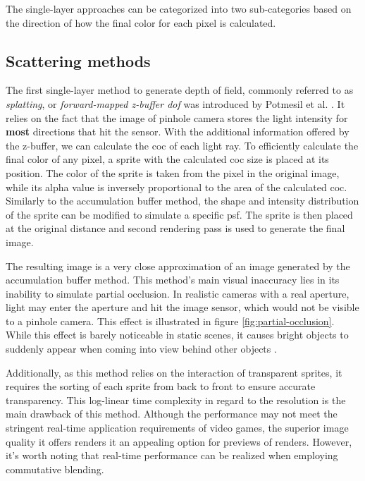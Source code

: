 The single-layer approaches can be categorized into two sub-categories based on the direction of how the final color for each pixel is calculated.

\subsection{Scattering methods}
The first single-layer method to generate depth of field, commonly referred to as \textit{splatting}, or \textit{forward-mapped z-buffer \gls{dof}} was introduced by Potmesil et al. \cite{Potmesil.1981}.
It relies on the fact that the image of pinhole camera stores the light intensity for \textbf{most} directions that hit the sensor.
With the additional information offered by the z-buffer, we can calculate the \gls{coc} of each light ray.
To efficiently calculate the final color of any pixel, a sprite with the calculated \gls{coc} size is placed at its position.
The color of the sprite is taken from the pixel in the original image, while its alpha value is inversely proportional to the area of the calculated \gls{coc}.
Similarly to the accumulation buffer method, the shape and intensity distribution of the sprite can be modified to simulate a specific \gls{psf}.
The sprite is then placed at the original distance and second rendering pass is used to generate the final image.

The resulting image is a very close approximation of an image generated by the accumulation buffer method.
This method's main visual inaccuracy lies in its inability to simulate partial occlusion.
In realistic cameras with a real aperture, light may enter the aperture and hit the image sensor, which would not be visible to a pinhole camera.
This effect is illustrated in figure \ref{fig:partial-occlusion}.
While this effect is barely noticeable in static scenes, it causes bright objects to suddenly appear when coming into view behind other objects \cite{Demers.2005}.

Additionally, as this method relies on the interaction of transparent sprites, it requires the sorting of each sprite from back to front to ensure accurate transparency.
This log-linear time complexity in regard to the resolution is the main drawback of this method.
Although the performance may not meet the stringent real-time application requirements of video games, the superior image quality it offers renders it an appealing option for previews of renders.
However, it's worth noting that real-time performance can be realized when employing commutative blending.

